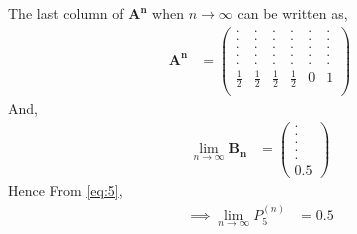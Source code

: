 \documentclass[journal,12pt,onecolumn]{IEEEtran}
\begin{document}
The last column of $ \mathbf{A^n}$ when $n \to \infty$ can be written as,
\begin{align}
\mathbf{A^n} &= 
\begin{pmatrix}
. & . & . & . & . & . \\
. & . & . & . & . & . \\
. & . & . & . & . & . \\
. & . & . & . & . & . \\
. & . & . & . & . & . \\
\frac{1}{2} & \frac{1}{2} & \frac{1}{2} & \frac{1}{2} & 0 & 1 \\[4pt]
\end{pmatrix}
\end{align}
And,
\begin{align}
\lim_{n \to \infty} \mathbf{B_{n}} &= 
\begin{pmatrix}
. \\
. \\
. \\
. \\
. \\
0.5
\end{pmatrix}
\end{align} 
Hence From \eqref{eq:5},
\begin{align} 
\implies \lim_{n \to \infty} P_{5}^{(n)} &= 0.5
\end{align} 
\end{document}
